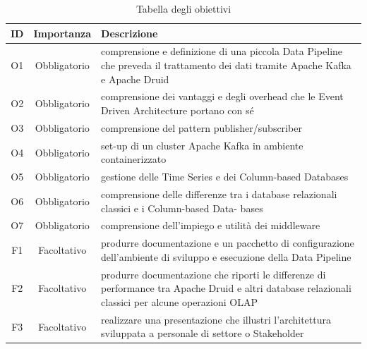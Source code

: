  \begin{table}[htbp]
    \centering
    \caption{Tabella degli obiettivi}    
    \label{tab:Tabella1}
    \begin{tabularx}{\textwidth}{|c|c|X|}
        \hline
        \textbf{ID} & \textbf{Importanza} & \textbf{Descrizione} \\\hline
        O1 & Obbligatorio & comprensione e definizione di una piccola \gls{Data Pipeline}{}  che  preveda il trattamento dei dati
        tramite Apache Kafka e Apache Druid \\\hline
        O2 & Obbligatorio & comprensione dei vantaggi e degli overhead  che le Event Driven Architecture portano con
        sé\\\hline
        O3 & Obbligatorio & comprensione del pattern publisher/subscriber \\\hline
        O4 & Obbligatorio & set-up di un cluster Apache Kafka in ambiente  containerizzato \\\hline
        O5 & Obbligatorio & gestione delle Time Series e dei Column-based Databases \\\hline
        O6 & Obbligatorio & comprensione delle differenze tra i database relazionali  classici e i Column-based Data-
        bases\\\hline
        O7 & Obbligatorio &comprensione dell’impiego e utilità dei middleware \\\hline
        F1 & Facoltativo & produrre documentazione e un pacchetto di configurazione  dell’ambiente di sviluppo e
        esecuzione  della \gls{Data Pipeline}{}\\\hline
        F2 & Facoltativo & produrre documentazione che riporti  le differenze  di performance  tra Apache Druid e altri
         database relazionali classici per alcune  operazioni OLAP \\\hline
        F3 & Facoltativo & realizzare una presentazione che illustri l’architettura  sviluppata  a personale di settore o
        Stakeholder \\\hline
    \end{tabularx} 

\end{table}

\pagebreak
